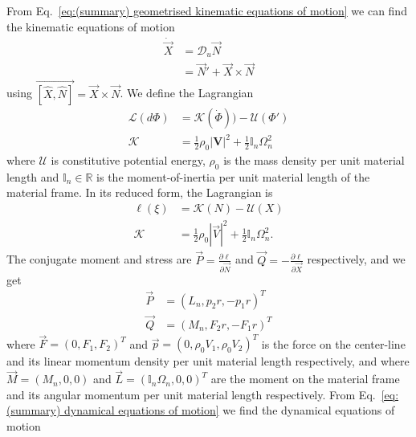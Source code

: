 From Eq.~\ref{eq:(summary) geometrised kinematic equations of motion} we can find the kinematic equations of motion
\begin{equation} \label{eq:cosserat rod on sphere kinematic eoms}
\begin{aligned}
\dot{\vec{X}} & = \mathcal{D}_u \vec{N} \\
& = \vec{N}' + \vec{X} \times \vec{N}
\end{aligned}
\end{equation}
using $\overrightarrow{[\hat{X}, \hat{N}]} = \vec{X} \times \vec{N}$. We define the Lagrangian
\begin{subequations} \label{eq:cosserat rod on sphere lagrangian}
\begin{align}
\mathcal{L}(d \Phi) & = \mathcal{K}(\dot{\Phi})) - \mathcal{U}(\Phi') \\
\mathcal{K} & = \frac{1}{2} \rho_0 |\mathbf{V}|^2 + \frac{1}{2} \mathbb{I}_n \Omega_n^2
\end{align}
\end{subequations}
where $\mathcal{U}$ is constitutive potential energy, $\rho_0$ is the mass density per unit material length and $\mathbb{I}_n \in \mathbb{R}$ is the moment-of-inertia per unit material length of the material frame.  In its reduced form, the Lagrangian is
\begin{subequations} \label{eq:cosserat rod on sphere reduced lagrangian}
\begin{align}
\mathcal{\ell}(\xi) & = \mathcal{K}(N) - \mathcal{U}(X) \\
\mathcal{K} & = \frac{1}{2} \rho_0 |\vec{V}|^2 + \frac{1}{2} \mathbb{I}_n \Omega_n^2.
\end{align}
\end{subequations}
The conjugate moment and stress are $\vec{P} = \frac{\partial \ell}{\partial \vec{N}}$ and $\vec{Q} = -\frac{\partial \ell}{\partial \vec{X}}$ respectively, and we get
\begin{subequations} 
\begin{align}
\vec{P} & = (L_n, p_2 r, - p_1 r)^T \\
\vec{Q} & = (M_n, F_2 r, - F_1 r)^T
\end{align}
\end{subequations}
where $\vec{F} = (0, F_1, F_2)^T$ and $\vec{p} = (0, \rho_0 V_1, \rho_0 V_2)^T$ is the force on the center-line and its linear momentum density per unit material length respectively, and where $\vec{M} = (M_n, 0, 0)$ and $\vec{L} = (\mathbb{I}_n \Omega_n, 0, 0)^T$ are the moment on the material frame and its angular momentum per unit material length respectively. From Eq.~\ref{eq:(summary) dynamical equations of motion} we find the dynamical equations of motion
